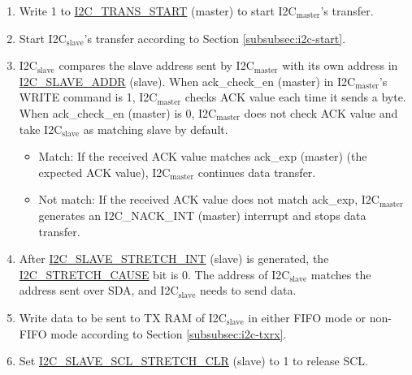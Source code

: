 \documentclass[main\_\_EN.tex]{subfiles}
\begin{document}
\begin{enumerate}
\item Write 1 to \hyperref[fielddesc:I2CTRANSSTART]{I2C\_TRANS\_START} (master) to start I2C$_\text{master}$'s transfer.
\item Start I2C$_\text{slave}$'s transfer according to Section \ref{subsubsec:i2c-start}.
\item I2C$_\text{slave}$ compares the slave address sent by I2C$_\text{master}$ with its own address in \hyperref[fielddesc:I2CSLAVEADDR]{I2C\_SLAVE\_ADDR} (slave). When ack\_check\_en (master) in I2C$_\text{master}$'s WRITE command is 1, I2C$_\text{master}$ checks ACK value each time it sends a byte. When ack\_check\_en (master) is 0, I2C$_\text{master}$ does not check ACK value and take I2C$_\text{slave}$ as matching slave by default.
\begin{itemize}
\item Match: If the received ACK value matches ack\_exp (master) (the expected ACK value), I2C$_\text{master}$ continues data transfer.
\item Not match: If the received ACK value does not match ack\_exp, I2C$_\text{master}$ generates an I2C\_NACK\_INT (master) interrupt and stops data transfer.
\end{itemize}

\item After \hyperref[int:i2c-slave-stretch]{I2C\_SLAVE\_STRETCH\_INT} (slave) is generated, the \hyperref[fielddesc:I2CSTRETCHCAUSE]{I2C\_STRETCH\_CAUSE} bit is 0. The address of I2C$_\text{slave}$ matches the address sent over SDA, and I2C$_\text{slave}$ needs to send data.

\item Write data to be sent to TX RAM of I2C$_\text{slave}$ in either FIFO mode or non-FIFO mode according to Section \ref{subsubsec:i2c-txrx}.
\item Set \hyperref[fielddesc:I2CSLAVESCLSTRETCHCLR]{I2C\_SLAVE\_SCL\_STRETCH\_CLR} (slave) to 1 to release SCL.



\end{enumerate}
\end{document}
